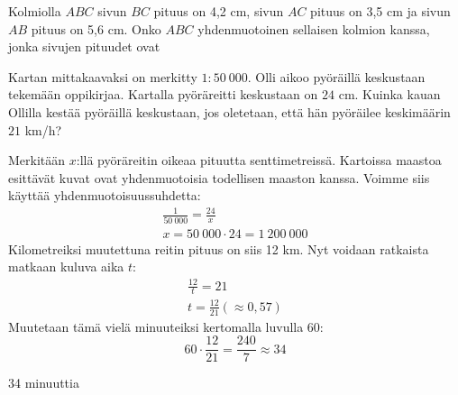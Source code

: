 \begin{esimerkki}
Kolmiolla $ABC$ sivun $BC$ pituus on 4,2 cm, sivun $AC$ pituus on 3,5 cm ja sivun
$AB$ pituus on 5,6 cm. Onko $ABC$ yhdenmuotoinen sellaisen kolmion kanssa, jonka
sivujen pituudet ovat
\begin{esimratk}
\end{esimratk}
\begin{esimvast}
\end{esimvast}
\end{esimerkki}

\begin{esimerkki}
Kartan mittakaavaksi on merkitty $1:50\ 000$. Olli aikoo pyöräillä keskustaan tekemään
oppikirjaa. Kartalla pyöräreitti keskustaan on $24$ cm. Kuinka kauan Ollilla kestää
pyöräillä keskustaan, jos oletetaan, että hän pyöräilee keskimäärin $21$ km/h?
\begin{esimratk}
Merkitään $x$:llä pyöräreitin oikeaa pituutta senttimetreissä.
Kartoissa maastoa esittävät kuvat ovat yhdenmuotoisia todellisen maaston kanssa. Voimme
siis käyttää yhdenmuotoisuussuhdetta:
\begin{align*}
\frac{1}{50\ 000} = \frac{24}{x} \\
x = 50\ 000 \cdot 24 = 1\ 200\ 000
\end{align*}
Kilometreiksi muutettuna reitin pituus on siis 12 km. Nyt voidaan ratkaista matkaan kuluva
aika $t$:
\begin{align*}
\frac{12}{t} = 21 \\
t = \frac{12}{21} (\approx 0,57)
\end{align*}
Muutetaan tämä vielä minuuteiksi kertomalla luvulla 60:
\[
60 \cdot \frac{12}{21} = \frac{240}{7} \approx 34
\]
\end{esimratk}
\begin{esimvast}
34 minuuttia
\end{esimvast}
\end{esimerkki}

